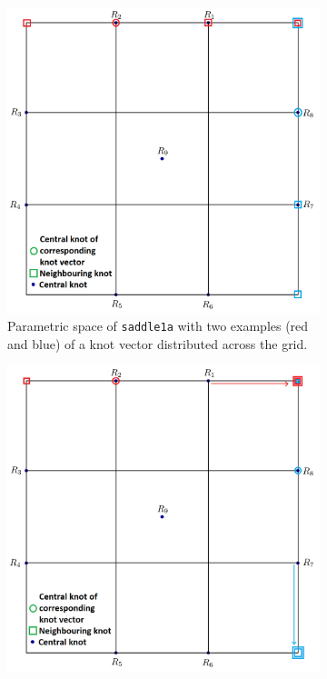 \documentclass{article}
\begin{document}
\begin{figure}[H]
\centering
\begin{subfigure}[b]{0.48\textwidth}
\includegraphics[width=\textwidth]{saddle1aparam}
\caption{Parametric space of \texttt{saddle1a} with two examples (red and blue) of a knot vector distributed across the grid.}
\label{saddle1ap}
\end{subfigure}
\begin{subfigure}[b]{0.48\textwidth}
\includegraphics[width=\textwidth]{saddle1bparam}

\end{subfigure}
\end{figure}
\end{document}
